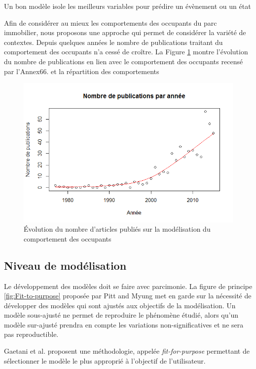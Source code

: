 Un bon modèle isole les meilleurs variables pour prédire un évènement ou un état



Afin de considérer au mieux les comportements des occupants du parc immobilier, nous proposons une approche qui permet de considérer la variété de contextes. Depuis quelques années le nombre de publications traitant du comportement des occupants n'a cessé de croître. La Figure \ref{fig:NbPerYear} montre l'évolution du nombre de publications en lien avec le comportement des occupants recensé par l'Annex66.  et la répartition des comportements 

\begin{figure}[h]
\centering
\includegraphics[scale=0.6]{Images/NbPerYear/NbPerYear}
\caption{Évolution du nombre d'articles publiés sur la modélisation du comportement des occupants}
\label{fig:NbPerYear}
\end{figure}

\subsection{Niveau de modélisation}

Le développement des modèles doit se faire avec parcimonie. La figure de principe \ref{fig:Fit-to-purpose} proposée par Pitt and Myung \cite{Pitt-02} met en garde sur la nécessité de développer des modèles qui sont ajustés aux objectifs de la modélisation. Un modèle sous-ajusté ne permet de reproduire le phénomène étudié, alors qu'un modèle sur-ajusté prendra en compte les variations non-significatives et ne sera pas reproductible. 

Gaetani et al. \cite{Gaetani-16} proposent une méthodologie, appelée \textit{fit-for-purpose} permettant de sélectionner le modèle le plus approprié à l'objectif de l'utilisateur. 

